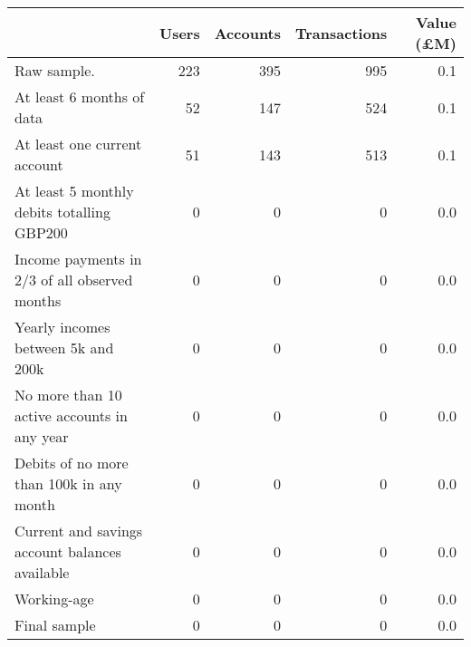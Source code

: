 \begin{tabular}{lrrrr}
\toprule
                                               & Users & Accounts & Transactions & Value (\pounds M) \\
\midrule
                                   Raw sample. &   223 &      395 &          995 &               0.1 \\
                     At least 6 months of data &    52 &      147 &          524 &               0.1 \\
                  At least one current account &    51 &      143 &          513 &               0.1 \\
    At least 5 monthly debits totalling GBP200 &     0 &        0 &            0 &               0.0 \\
 Income payments in 2/3 of all observed months &     0 &        0 &            0 &               0.0 \\
            Yearly incomes between 5k and 200k &     0 &        0 &            0 &               0.0 \\
   No more than 10 active accounts in any year &     0 &        0 &            0 &               0.0 \\
      Debits of no more than 100k in any month &     0 &        0 &            0 &               0.0 \\
Current and savings account balances available &     0 &        0 &            0 &               0.0 \\
                                   Working-age &     0 &        0 &            0 &               0.0 \\
                                  Final sample &     0 &        0 &            0 &               0.0 \\
\bottomrule
\end{tabular}
